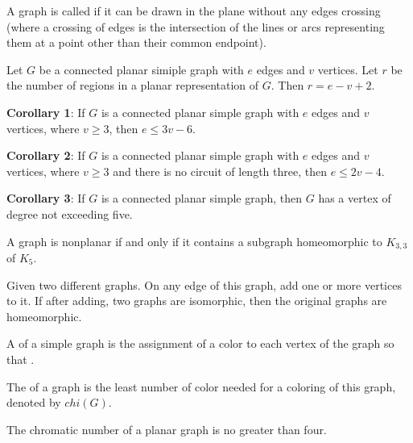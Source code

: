        \par A graph is called  if it can be drawn in the plane without any
        edges crossing (where a crossing of edges is the intersection of the lines or 
        arcs representing them at a point other than their common endpoint).
        \par Let $G$ be a connected planar simiple graph with $e$ edges and $v$ vertices.
        Let $r$ be the number of regions in a planar representation of $G$. Then
        $r = e - v + 2$.
        \par \textbf{Corollary 1}: If $G$ is a connected planar simple graph with $e$
        edges and $v$ vertices, where $v \geq 3$, then $e \leq 3v - 6$.
        \par \textbf{Corollary 2}: If $G$ is a connected planar simple graph with $e$
        edges and $v$ vertices, where $v \geq 3$ and there is no circuit of length three,
        then $e \leq 2v - 4$.
        \par \textbf{Corollary 3}: If $G$ is a connected planar simple graph, then $G$
        has a vertex of degree not exceeding five.
            \par A graph is nonplanar if and only if it contains a subgraph
            homeomorphic to $K_{3, 3}$ of $K_{5}$.
            \par Given two different graphs. On any edge of this graph, add one or more 
            vertices to it. If after adding, two graphs are isomorphic, then the original
            graphs are homeomorphic.
        \hiiiEND

        \par A  of a simple graph is the assignment of a color to each
        vertex of the graph so that .
        \par The  of a graph is the least number of color needed
        for a coloring of this graph, denoted by $chi(G)$.
        \par The chromatic number of a planar graph is no greater than four.
